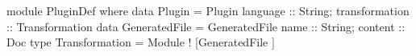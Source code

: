 module PluginDef where
  data Plugin = Plugin {
    language :: String;
    transformation :: Transformation
  }
  data GeneratedFile = GeneratedFile {
    name :: String;
    content :: Doc
  }
  type Transformation = Module ! [GeneratedFile ]